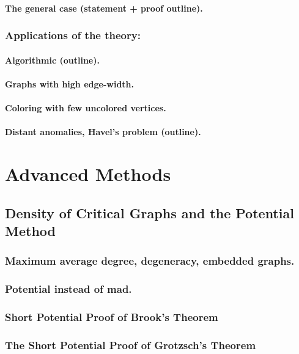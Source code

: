 \documentclass[12pt,twoside,openright,a4paper]{book}
\begin{document}
\subsection{The general case (statement + proof outline).}

\section{Applications of the theory:}
\subsection{Algorithmic (outline).}
\subsection{Graphs with high edge-width.}
\subsection{Coloring with few uncolored vertices.}
\subsection{Distant anomalies, Havel's problem (outline).}

\part{Advanced Methods}

\chapter{Density of Critical Graphs and the Potential Method}


\section{Maximum average degree, degeneracy, embedded graphs.}
\section{Potential instead of mad.}
\section{Short Potential Proof of Brook's Theorem}
\section{The Short Potential Proof of Grotzsch's Theorem}
\end{document}
